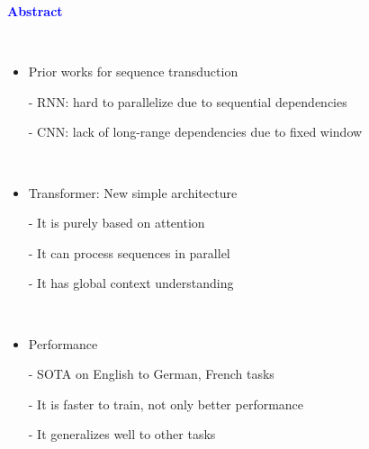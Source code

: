 \documentclass[professionalfont]{beamer}
\begin{document}
\frame{\titlepage}


\begin{frame}
\begin{center}
    { \textbf{\textcolor{blue}{ {\fontsize{12}{14}\selectfont Abstract} }} }
\end{center}
\\[0.3cm]

{\fontsize{10}{14}\selectfont 
\begin{itemize}
    \item Prior works for sequence transduction
    
    - RNN: hard to parallelize due to sequential dependencies

    - CNN: lack of long-range dependencies due to fixed window

    \\[0.5cm]

    \item Transformer: New simple architecture

    - It is purely based on attention

    - It can process sequences in parallel
    
    - It has global context understanding

    \\[0.5cm]

    \item Performance

    - SOTA on English to German, French tasks

    - It is faster to train, not only better performance

    - It generalizes well to other tasks
\end{itemize}
}

\end{frame}

\end{document}
